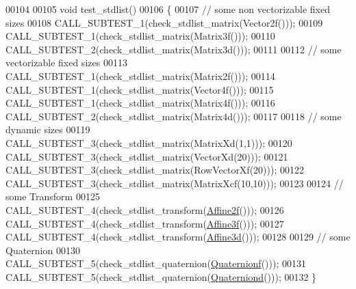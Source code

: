 \begin{DoxyCode}
00104 
00105 \textcolor{keywordtype}{void} test\_stdlist()
00106 \{
00107   \textcolor{comment}{// some non vectorizable fixed sizes}
00108   CALL\_SUBTEST\_1(check\_stdlist\_matrix(Vector2f()));
00109   CALL\_SUBTEST\_1(check\_stdlist\_matrix(Matrix3f()));
00110   CALL\_SUBTEST\_2(check\_stdlist\_matrix(Matrix3d()));
00111 
00112   \textcolor{comment}{// some vectorizable fixed sizes}
00113   CALL\_SUBTEST\_1(check\_stdlist\_matrix(Matrix2f()));
00114   CALL\_SUBTEST\_1(check\_stdlist\_matrix(Vector4f()));
00115   CALL\_SUBTEST\_1(check\_stdlist\_matrix(Matrix4f()));
00116   CALL\_SUBTEST\_2(check\_stdlist\_matrix(Matrix4d()));
00117 
00118   \textcolor{comment}{// some dynamic sizes}
00119   CALL\_SUBTEST\_3(check\_stdlist\_matrix(MatrixXd(1,1)));
00120   CALL\_SUBTEST\_3(check\_stdlist\_matrix(VectorXd(20)));
00121   CALL\_SUBTEST\_3(check\_stdlist\_matrix(RowVectorXf(20)));
00122   CALL\_SUBTEST\_3(check\_stdlist\_matrix(MatrixXcf(10,10)));
00123 
00124   \textcolor{comment}{// some Transform}
00125   CALL\_SUBTEST\_4(check\_stdlist\_transform(\hyperlink{group___geometry___module_ga2c1ea05a21899654ee3a2e3f91fa30e0}{Affine2f}()));
00126   CALL\_SUBTEST\_4(check\_stdlist\_transform(\hyperlink{group___geometry___module_ga17e901de8ff882aea7845c5457db6a4f}{Affine3f}()));
00127   CALL\_SUBTEST\_4(check\_stdlist\_transform(\hyperlink{group___geometry___module_gaaffa69d3143826efeb84e5d6c56a4c78}{Affine3d}()));
00128 
00129   \textcolor{comment}{// some Quaternion}
00130   CALL\_SUBTEST\_5(check\_stdlist\_quaternion(\hyperlink{group___geometry___module_ga785b13a5a87f9bf55d4eba51ead2dcf0}{Quaternionf}()));
00131   CALL\_SUBTEST\_5(check\_stdlist\_quaternion(\hyperlink{group___geometry___module_ga6e77eb8b6aae0e04be2db88107dbc642}{Quaterniond}()));
00132 \}
\end{DoxyCode}
